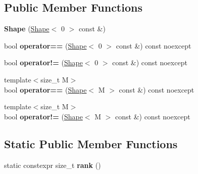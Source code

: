 \subsection*{Public Member Functions}
\begin{DoxyCompactItemize}
\item 
{\bfseries Shape} (\hyperlink{classtensor_1_1Shape}{Shape}$<$ 0 $>$ const \&)\hypertarget{classtensor_1_1Shape_3_010_01_4_ac343bf46319a4a89ca80b5ccc3608bf7}{}\label{classtensor_1_1Shape_3_010_01_4_ac343bf46319a4a89ca80b5ccc3608bf7}

\item 
bool {\bfseries operator==} (\hyperlink{classtensor_1_1Shape}{Shape}$<$ 0 $>$ const \&) const noexcept\hypertarget{classtensor_1_1Shape_3_010_01_4_a51391d1d3addb07ee2611cdb1581a9e8}{}\label{classtensor_1_1Shape_3_010_01_4_a51391d1d3addb07ee2611cdb1581a9e8}

\item 
bool {\bfseries operator!=} (\hyperlink{classtensor_1_1Shape}{Shape}$<$ 0 $>$ const \&) const noexcept\hypertarget{classtensor_1_1Shape_3_010_01_4_ae1ff8093c962f0cde6f7aff0e4843a92}{}\label{classtensor_1_1Shape_3_010_01_4_ae1ff8093c962f0cde6f7aff0e4843a92}

\item 
{\footnotesize template$<$size\+\_\+t M$>$ }\\bool {\bfseries operator==} (\hyperlink{classtensor_1_1Shape}{Shape}$<$ M $>$ const \&) const noexcept\hypertarget{classtensor_1_1Shape_3_010_01_4_af9ae3623ccbc92d51e56a703e9e53fe3}{}\label{classtensor_1_1Shape_3_010_01_4_af9ae3623ccbc92d51e56a703e9e53fe3}

\item 
{\footnotesize template$<$size\+\_\+t M$>$ }\\bool {\bfseries operator!=} (\hyperlink{classtensor_1_1Shape}{Shape}$<$ M $>$ const \&) const noexcept\hypertarget{classtensor_1_1Shape_3_010_01_4_aa6a66b20a263d0bbf4cdca2fe1d0d092}{}\label{classtensor_1_1Shape_3_010_01_4_aa6a66b20a263d0bbf4cdca2fe1d0d092}

\end{DoxyCompactItemize}
\subsection*{Static Public Member Functions}
\begin{DoxyCompactItemize}
\item 
static constexpr size\+\_\+t {\bfseries rank} ()\hypertarget{classtensor_1_1Shape_3_010_01_4_af77da58c4771213109f60928683b1280}{}\label{classtensor_1_1Shape_3_010_01_4_af77da58c4771213109f60928683b1280}

\end{DoxyCompactItemize}
